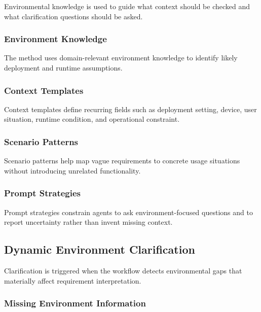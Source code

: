 Environmental knowledge is used to guide what context should be checked and what clarification questions should be asked.

\subsubsection{Environment Knowledge}
\label{method:environment_knowledge}

The method uses domain-relevant environment knowledge to identify likely deployment and runtime assumptions.

\subsubsection{Context Templates}
\label{method:context_templates}

Context templates define recurring fields such as deployment setting, device, user situation, runtime condition, and operational constraint.

\subsubsection{Scenario Patterns}
\label{method:scenario_patterns}

Scenario patterns help map vague requirements to concrete usage situations without introducing unrelated functionality.

\subsubsection{Prompt Strategies}
\label{method:prompt_strategies}

Prompt strategies constrain agents to ask environment-focused questions and to report uncertainty rather than invent missing context.

\subsection{Dynamic Environment Clarification}
\label{method:clarification}

Clarification is triggered when the workflow detects environmental gaps that materially affect requirement interpretation.

\subsubsection{Missing Environment Information}
\label{method:missing_environment}


